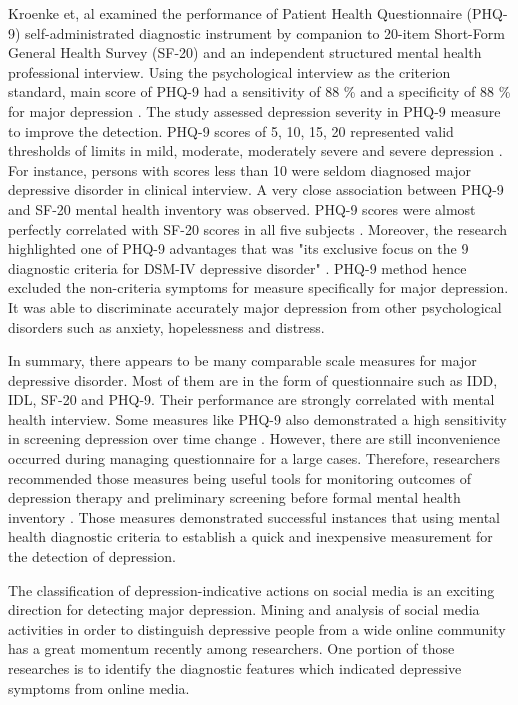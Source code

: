\documentclass[10pt,journal,compsoc]{IEEEtran}
\begin{document}
Kroenke et, al \cite{Kroenke} examined the performance of Patient Health Questionnaire (PHQ-9) self-administrated diagnostic instrument by companion to 20-item Short-Form General Health Survey (SF-20) and an independent structured mental health professional interview. Using the psychological interview as the criterion standard, main score of PHQ-9 had a sensitivity of 88 \% and a specificity of 88 \% for major depression \cite{Kroenke}. The study assessed depression severity in PHQ-9 measure to improve the detection.  PHQ-9 scores of 5, 10, 15, 20 represented valid thresholds of limits in mild, moderate, moderately severe and severe depression \cite{Kroenke}. For instance, persons with scores less than 10 were seldom diagnosed major depressive disorder in clinical interview. A very close association between PHQ-9 and SF-20 mental health inventory was observed. PHQ-9 scores were almost perfectly correlated with SF-20 scores in all five subjects \cite{Kroenke}. Moreover, the research highlighted one of PHQ-9 advantages that was "its exclusive focus on the 9 diagnostic criteria for DSM-IV depressive disorder" \cite{Kroenke}. PHQ-9 method hence excluded the non-criteria symptoms for measure specifically for major depression. It was able to discriminate accurately major depression from other psychological disorders such as anxiety, hopelessness and distress.

In summary, there appears to be many comparable scale measures for major depressive disorder. Most of them are in the form of questionnaire such as IDD, IDL, SF-20 and PHQ-9. Their performance are strongly correlated with mental health interview. Some measures like PHQ-9 also demonstrated a high sensitivity in screening depression over time change \cite{Kroenke}. However, there are still inconvenience occurred during managing questionnaire for a large cases. Therefore, researchers recommended those measures being useful tools for monitoring outcomes of depression therapy \cite{Kroenke} and preliminary screening before formal mental health inventory \cite{Sakado}. Those measures demonstrated successful instances that using mental health diagnostic criteria to establish a quick and inexpensive measurement for the detection of depression.

The classification of depression-indicative actions on social media is an exciting direction for detecting major depression. Mining and analysis of social media activities in order to distinguish depressive people from a wide online community has a great momentum recently among researchers. One portion of those researches is to identify the diagnostic features which indicated depressive symptoms from online media.
\end{document}
